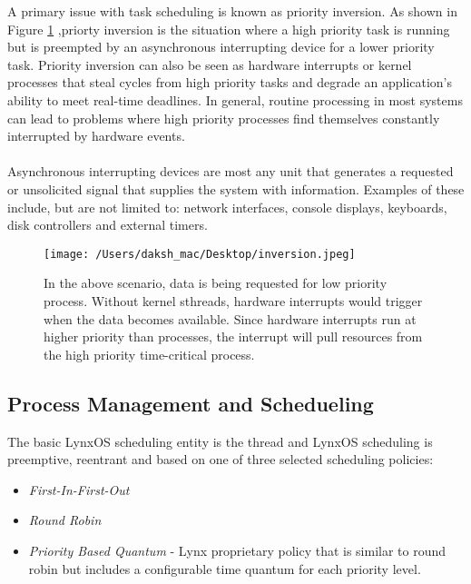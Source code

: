 \documentclass[12pt]{article}
\begin{document}
A primary issue with task scheduling is known as priority inversion. As shown in Figure
\ref{fig:inversion} ,priorty inversion is the situation where a high priority task is running but is preempted
by an asynchronous interrupting device for a lower priority task. Priority inversion can
also be seen as hardware interrupts or kernel processes that steal cycles from high priority
tasks and degrade an application’s ability to meet real-time deadlines. In general, routine
processing in most systems can lead to problems where high priority processes find
themselves constantly interrupted by hardware events.\\\\
Asynchronous interrupting devices are most any unit that generates a requested or
unsolicited signal that supplies the system with information. Examples of these include,
but are not limited to: network interfaces, console displays, keyboards, disk controllers
and external timers.\\

\begin{figure}[H]
	\centering
	\texttt{[image: /Users/daksh\_mac/Desktop/inversion.jpeg]}
	\caption[About Priority Inversion]{In the above scenario, data is being requested for low priority process. Without kernel sthreads, hardware interrupts would trigger when the data becomes available. Since
hardware interrupts run at higher priority than processes, the interrupt will pull resources
from the high priority time-critical process.}
	\label{fig:inversion}	
\end{figure}

\cleardoublepage

\subsection{Process Management and Schedueling}

The basic LynxOS scheduling entity is the thread and LynxOS scheduling is preemptive,
reentrant and based on one of three selected scheduling policies: 

\begin{itemize}
	\item \emph{First-In-First-Out}
	
	
	\item \emph{Round Robin}
	
	\item \emph{Priority Based Quantum} -  Lynx proprietary policy that is similar to round robin
but includes a configurable time quantum for each priority level.

\end{itemize}	
\end{document}
